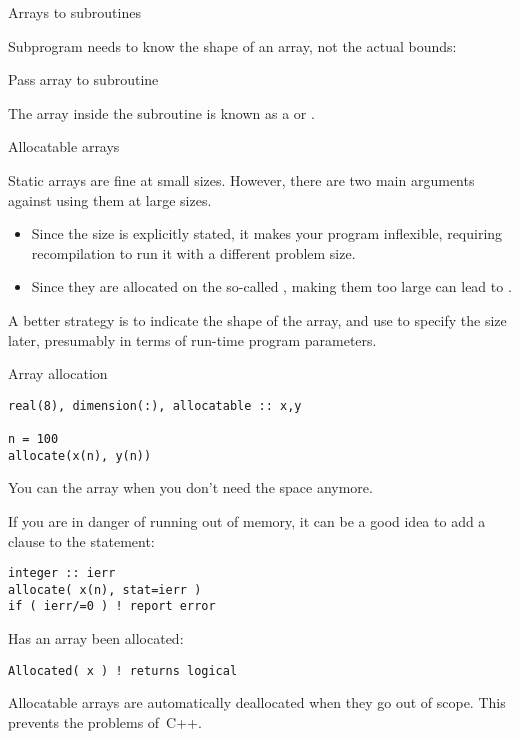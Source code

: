  {Arrays to subroutines}

Subprogram needs to know the shape of an array, not the actual bounds:

\begin{block}{Pass array to subroutine}
  \label{sl:farray-pass1d}
\end{block}

The array inside the subroutine is known as a
 or
.

 {Allocatable arrays}
\label{sec:allocatable}

Static arrays are fine at small sizes. However, 
there are two main arguments against using them at large sizes.
\begin{itemize}
\item Since the size is explicitly stated, it makes your program
  inflexible, requiring recompilation to run it with a different
  problem size.
\item Since they are allocated on the so-called ,
  making them too large can lead to .
\end{itemize}

A better strategy is to indicate the shape of the array, and use
 to specify
the size later, presumably in terms of run-time program parameters.

\begin{block}{Array allocation}
  \label{sl:farray-alloc}
\begin{verbatim}
real(8), dimension(:), allocatable :: x,y

n = 100
allocate(x(n), y(n))
\end{verbatim}
You can  the array when you don't need the
space anymore.
\end{block}

If you are in danger of running out of memory, it can be a good idea
to add a  clause to the  statement:
\begin{verbatim}
integer :: ierr
allocate( x(n), stat=ierr )
if ( ierr/=0 ) ! report error
\end{verbatim}

Has an array been allocated:
\begin{verbatim}
Allocated( x ) ! returns logical
\end{verbatim}

Allocatable arrays are automatically deallocated when they go out of
scope. This prevents the  problems of~C++.

